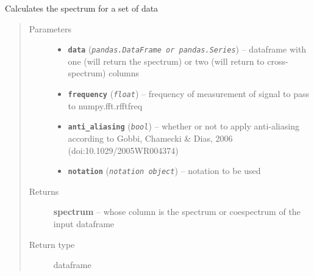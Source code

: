 \documentclass[a4paper,10pt,oneside]{sphinxmanual}
\begin{document}
\begin{fulllineitems}
\label{pymicra:pymicra.data.crossSpectra}
Calculates the spectrum for a set of data
\begin{quote}\begin{description}
\item[{Parameters}] \leavevmode\begin{itemize}
\item {} 
\textbf{\texttt{data}} (\emph{\texttt{pandas.DataFrame or pandas.Series}}) -- dataframe with one (will return the spectrum) or two (will return to cross-spectrum) columns

\item {} 
\textbf{\texttt{frequency}} (\emph{\texttt{float}}) -- frequency of measurement of signal to pass to numpy.fft.rfftfreq

\item {} 
\textbf{\texttt{anti\_aliasing}} (\emph{\texttt{bool}}) -- whether or not to apply anti-aliasing according to Gobbi, Chamecki \& Dias, 2006 (doi:10.1029/2005WR004374)

\item {} 
\textbf{\texttt{notation}} (\emph{\texttt{notation object}}) -- notation to be used

\end{itemize}

\item[{Returns}] \leavevmode
\textbf{spectrum} -- whose column is the spectrum or coespectrum of the input dataframe

\item[{Return type}] \leavevmode
dataframe

\end{description}\end{quote}

\end{fulllineitems}

\end{document}
